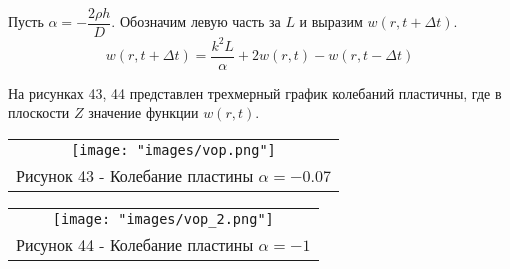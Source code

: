 Пусть $\alpha=-\dfrac{2\rho h}{D}$. Обозначим левую часть за $L$ и выразим $w(r,t+\Delta t)$.
\begin{equation}
  w(r,t+\Delta t)=\dfrac{k^2L}{\alpha}+2w(r,t)-w(r,t-\Delta t)
\end{equation}

На рисунках 43, 44 представлен трехмерный график колебаний пластичны, где в плоскости $Z$ значение функции $w(r,t)$.
\begin{center}
  \begin{tabular}{c}
  \texttt{[image: "images/vop.png"]}\\
  Рисунок 43 - Колебание пластины $\alpha=-0.07$
\end{tabular}
\end{center}
\begin{center}
  \begin{tabular}{c}
  \texttt{[image: "images/vop\_2.png"]}\\
  Рисунок 44 - Колебание пластины $\alpha=-1$
\end{tabular}
\end{center}


% 
